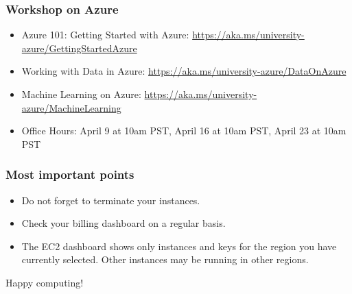 \documentclass{beamer}
\begin{document}
	\begin{frame}
	\frametitle{Workshop on Azure}
	\begin{itemize}
		\item Azure 101: Getting Started with Azure: \href{https://aka.ms/university-azure/GettingStartedAzure}{https://aka.ms/university-azure/GettingStartedAzure}
		\item Working with Data in Azure: \href{https://aka.ms/university-azure/DataOnAzure}{https://aka.ms/university-azure/DataOnAzure}
		\item Machine Learning on Azure: \href{https://aka.ms/university-azure/MachineLearning}{https://aka.ms/university-azure/MachineLearning}
		\item Office Hours: April 9 at 10am PST, April 16 at 10am PST, April 23 at 10am PST
	\end{itemize}
	\end{frame}

	\begin{frame}
	\frametitle{Most important points}
	\begin{itemize}
		\item Do not forget to terminate your instances.

		\vspace{0.5cm}

		\item Check your billing dashboard on a regular basis.

		\vspace{0.5cm}

		\item The EC2 dashboard shows only instances and keys for the region you have currently selected. Other instances may be running in other regions.
	\end{itemize}
	\end{frame}

	\begin{frame}
	\centering
		\Huge{Happy computing!}
	\end{frame}

\end{document}
